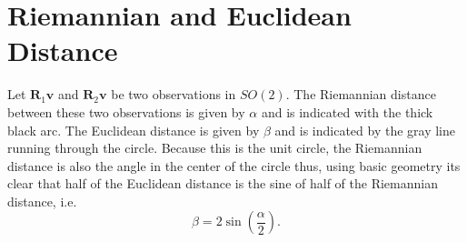 \begin{center}
\end{center}
\section{Riemannian and Euclidean Distance}
\label{sec:appendix2}
Let $\bm R_1\bm v$ and $\bm R_2\bm v$ be two observations in $SO(2)$.  The Riemannian distance between these two observations is given by $\alpha$ and is indicated with the thick black arc.  The Euclidean distance is given by $\beta$ and is indicated by the gray line running through the circle.  Because this is the unit circle, the Riemannian distance is also the angle in the center of the circle thus, using basic geometry its clear that half of the Euclidean distance is the sine of half of the Riemannian distance, i.e.
\[
\beta=2\sin\left(\frac{\alpha}{2}\right).
\]

